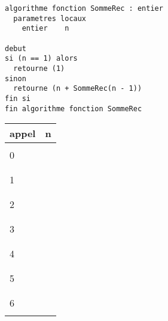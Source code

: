 \documentclass[11pt,a4paper]{article}
\begin{document}
\bigskip

\begin{table}[h!]
  \centering
  \begin{minipage}{0.55\textwidth}
    \centering
\begin{lstlisting}[style=algorithm]
algorithme fonction SommeRec : entier
  parametres locaux
    entier    n

debut
si (n == 1) alors
  retourne (1)
sinon
  retourne (n + SommeRec(n - 1))
fin si
fin algorithme fonction SommeRec \end{lstlisting}
  \end{minipage}
  \hfillx
  \begin{minipage}{0.17\textwidth}
    \centering
    \begin{tabular}{|C{1cm}|C{1cm}|}
        \hline
        appel &  n  \\
        \hline
              &     \\
        0     &     \\
              &     \\
        \hline
              &     \\
        1     &     \\
              &     \\
        \hline
              &     \\
        2     &     \\
              &     \\
        \hline
              &     \\
        3     &     \\
              &     \\
        \hline
              &     \\
        4     &     \\
              &     \\
        \hline
              &     \\
        5     &     \\
              &     \\
        \hline
              &     \\
        6     &     \\
              &     \\
        \hline
    \end{tabular}

\end{minipage}
\end{table}
\end{document}
